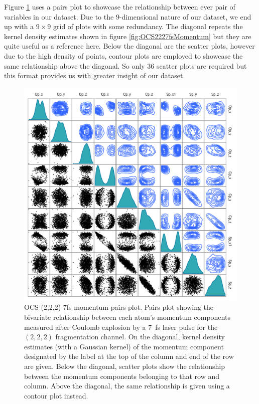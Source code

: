 Figure \ref{fig:OCS2227fsMomentumPairPlots} uses a pairs plot to showcase the relationship between ever pair of variables in our dataset. Due to the $9$-dimensional nature of our dataset, we end up with a $9\times9$ grid of plots with some redundancy. The diagonal repeats the kernel density estimates shown in figure \ref{fig:OCS2227fsMomentum} but they are quite useful as a reference here. Below the diagonal are the scatter plots, however due to the high density of points, contour plots are employed to showcase the same relationship above the diagonal. So only 36 scatter plots are required but this format provides us with greater insight of our dataset.

\begin{figure}
  \centering
  \includegraphics[width=\textwidth]{Plots/OCS2227fsMomentumPairPlots}
  \caption[OCS (2,2,2) 7fs momentum pairs plot.]
  {OCS (2,2,2) 7fs momentum pairs plot. Pairs plot showing the bivariate relationship between each atom's momentum components measured after Coulomb explosion by a \SI{7}{\fs} laser pulse for the $(2,2,2)$ fragmentation channel. On the diagonal, kernel density estimates (with a Gaussian kernel) of the momentum component designated by the label at the top of the column and end of the row are given. Below the diagonal, scatter plots show the relationship between the momentum components belonging to that row and column. Above the diagonal, the same relationship is given using a contour plot instead.}
  \label{fig:OCS2227fsMomentumPairPlots}
\end{figure}


